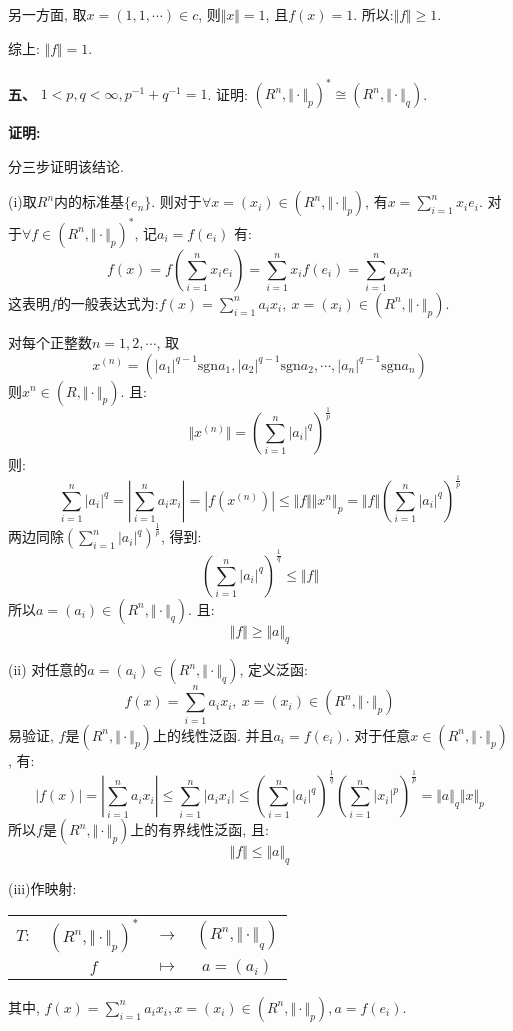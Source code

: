 \documentclass{article}
\begin{document}
另一方面, 取$x=(1,1,\cdots) \in c$, 则$\Vert x \Vert = 1$, 且$f(x) = 1 $. 所以:$\Vert f \Vert \geq 1$.

综上: $\Vert f \Vert = 1$. \\  \\  


\textbf{五、} $1 < p, q < \infty, p^{-1} + q^{-1} = 1$. 证明: $(R^n, \Vert \cdot \Vert_p)^* \cong (R^n, \Vert \cdot \Vert_q)$.

\textbf{证明:}

分三步证明该结论.

(i)取$R^{n}$内的标准基$\{ e_n\}$. 则对于$\forall x = (x_i) \in (R^n, \Vert \cdot \Vert_p)$, 有$x=\sum\limits_{i=1}^n x_ie_i$. 对于$\forall f \in (R^n, \Vert \cdot \Vert_p)^*$, 记$a_i = f(e_i)$ 有:
$$ f(x) = f(\sum\limits_{i=1}^n x_ie_i) = \sum\limits_{i=1}^n x_if(e_i) = \sum\limits_{i=1}^n a_ix_i $$
这表明$f$的一般表达式为:$f(x) = \sum\limits_{i=1}^n a_ix_i, \ x=(x_i) \in (R^n, \Vert \cdot \Vert_p)$. 

对每个正整数$n=1,2,\cdots$, 取
$$ x^{(n)} = (|a_1|^{q-1}\text{sgn}a_1, |a_2|^{q-1}\text{sgn}a_2, \cdots, |a_n|^{q-1}\text{sgn}a_n)$$
则$ x^{n} \in (R, \Vert \cdot \Vert_p)$. 且:
$$ \Vert x^{(n)} \Vert = \left( \sum\limits_{i=1}^n |a_i|^q \right)^{\frac{1}{p}} $$
则:
$$ \sum\limits_{i=1}^n |a_i|^q = |\sum\limits_{i=1}^n a_ix_i | = |f(x^{(n)})| \leq \Vert f \Vert \Vert x^{n} \Vert_p = \Vert f \Vert \left( \sum\limits_{i=1}^n |a_i|^q \right)^{\frac{1}{p}}  $$ 
两边同除$\left( \sum\limits_{i=1}^n |a_i|^q \right)^{\frac{1}{p}}$, 得到:
$$  \left( \sum\limits_{i=1}^n |a_i|^q \right)^{\frac{1}{q}} \leq \Vert f \Vert $$
所以$ a = (a_i) \in (R^n, \Vert \cdot \Vert_q)$. 且:
$$ \Vert f \Vert \geq \Vert a \Vert_q $$

(ii) 对任意的$a=(a_i) \in (R^n, \Vert \cdot \Vert_q)$, 定义泛函:
$$ f(x) = \sum\limits_{i=1}^{n} a_ix_i, \ x=(x_i) \in (R^n, \Vert \cdot \Vert_p) $$
易验证, $f$是$(R^n, \Vert \cdot \Vert_p)$上的线性泛函. 并且$a_i = f(e_i)$. 对于任意$x \in (R^n, \Vert \cdot \Vert_p)$, 有:
$$ |f(x)| = |\sum\limits_{i=1}^n a_ix_i| \leq \sum\limits_{i=1}^n |a_ix_i| \leq \left(\sum\limits_{i=1}^n |a_i|^q \right)^{\frac{1}{q}}\left( \sum\limits_{i=1}^n |x_i|^p \right)^{\frac{1}{p}} = \Vert a \Vert_q \Vert x \Vert_p $$
所以$f$是$(R^n, \Vert \cdot \Vert_p)$上的有界线性泛函, 且:
$$ \Vert f \Vert \leq \Vert a \Vert_q  $$

(iii)作映射:
\begin{center}
\begin{tabular}{cccc}
$T:$  &  $(R^n, \Vert \cdot \Vert_p)^*$ & $\longrightarrow$  &  $(R^n, \Vert \cdot \Vert_q)$ \\
      &         $f$                     & $\longmapsto$      &    $a = (a_i)$
\end{tabular}
\end{center}
其中, $f(x) = \sum\limits_{i=1}^n a_ix_i, x=(x_i) \in (R^n, \Vert \cdot \Vert_p), a = f(e_i)$. 
\end{document}
